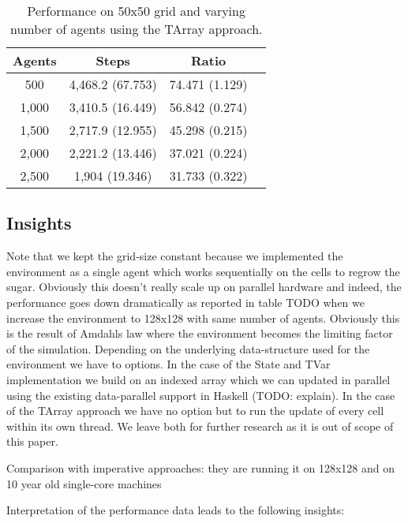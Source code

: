 \begin{table}
	\centering
  	\begin{tabular}{ c || c | c | c }
        Agents  & Steps            & Ratio          \\ \hline \hline 
    	500     & 4,468.2 (67.753) & 74.471 (1.129) \\ \hline
   		1,000   & 3,410.5 (16.449) & 56.842 (0.274) \\ \hline
   		1,500   & 2,717.9 (12.955) & 45.298 (0.215) \\ \hline
   		2,000   & 2,221.2 (13.446) & 37.021 (0.224) \\ \hline 
   		2,500   & 1,904 (19.346)   & 31.733 (0.322) \\ \hline 
   	\end{tabular}
  	
  	\caption{Performance on 50x50 grid and varying number of agents using the TArray approach.}
	\label{tab:tarray_results_agentsscale_time}
\end{table}

\subsection{Insights}
Note that we kept the grid-size constant because we implemented the environment as a single agent which works sequentially on the cells to regrow the sugar. Obviously this doesn't really scale up on parallel hardware and indeed, the performance goes down dramatically as reported in table TODO when we increase the environment to 128x128 with same number of agents. Obviously this is the result of Amdahls law where the environment becomes the limiting factor of the simulation.
Depending on the underlying data-structure used for the environment we have to options. In the case of the State and TVar implementation we build on an indexed array which we can updated in parallel using the existing data-parallel support in Haskell (TODO: explain). In the case of the TArray approach we have no option but to run the update of every cell within its own thread. We leave both for further research as it is out of scope of this paper.

Comparison with imperative approaches: they are running it on 128x128 and on 10 year old single-core machines  \cite{lysenko_framework_2008}

Interpretation of the performance data leads to the following insights:
